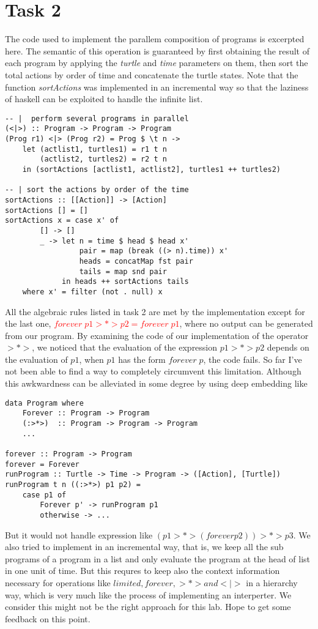 \documentclass[10pt]{article}
\begin{document}
\section*{Task 2}
The code used to implement the parallem composition of programs is excerpted here. The semantic of this operation is guaranteed by first obtaining the result of each program by applying the \textit{turtle} and \textit{time} parameters on them, then sort the total actions by order of time and concatenate the turtle states. Note that the function \textit{sortActions} was implemented in an incremental way so that the laziness of haskell can be exploited to handle the infinite list.
\begin{lstlisting}
-- |  perform several programs in parallel
(<|>) :: Program -> Program -> Program
(Prog r1) <|> (Prog r2) = Prog $ \t n ->
    let (actlist1, turtles1) = r1 t n
        (actlist2, turtles2) = r2 t n
    in (sortActions [actlist1, actlist2], turtles1 ++ turtles2)

-- | sort the actions by order of the time
sortActions :: [[Action]] -> [Action]
sortActions [] = []
sortActions x = case x' of
        [] -> []
        _ -> let n = time $ head $ head x'
                 pair = map (break ((> n).time)) x'
                 heads = concatMap fst pair
                 tails = map snd pair
             in heads ++ sortActions tails
    where x' = filter (not . null) x
\end{lstlisting}

All the algebraic rules listed in task 2 are met by the implementation except for the last one, \textcolor{red}{$forever\; p1 >*> p2 = forever\; p1$}, where no output can be generated from our program. By examining the code of our implementation of the operator $>*>$, we noticed that the evaluation of the expression $p1 >*> p2$ depends on the evaluation of $p1$, when $p1$ has the form $forever\; p$, the code fails. So far I've not been able to find a way to completely circumvent this limitation. Although this awkwardness can be alleviated in some degree by using deep embedding like
\begin{lstlisting}
data Program where
    Forever :: Program -> Program
    (:>*>)  :: Program -> Program -> Program
    ...
    
forever :: Program -> Program
forever = Forever
runProgram :: Turtle -> Time -> Program -> ([Action], [Turtle])
runProgram t n ((:>*>) p1 p2) =
    case p1 of
        Forever p' -> runProgram p1
        otherwise -> ...
\end{lstlisting}
But it would not handle expression like $(p1 >*> (forever p2)) >*> p3$. We also tried to implement  in an incremental way, that is, we keep all the sub programs of a program in a list and only evaluate the program at the head of list in one unit of time. But this requres to keep also the context information necessary for operations like $limited, forever, >*> and <|>$ in a hierarchy way, which is very much like the process of implementing an interperter. We consider this might not be the right approach for this lab. Hope to get some feedback on this point.
\end{document}
